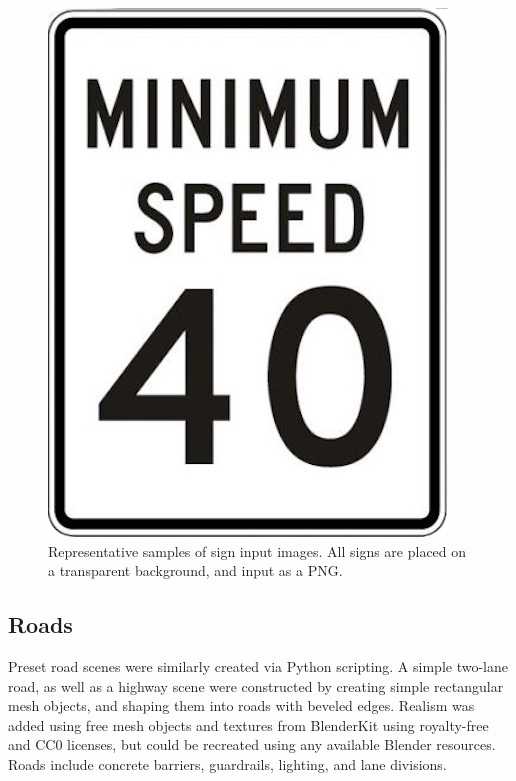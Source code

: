 \documentclass[journal]{IEEEtran}
\begin{document}
\begin{figure}[ht]
\begin{minipage}{0.1\textwidth}
    \end{minipage}\hfill
    \begin{minipage}{0.1\textwidth}
        \centering
        \includegraphics[width=\linewidth]{images/Minimum Speed 40.png}

    \end{minipage}
    \setcounter{figure}{1}
    \caption{Representative samples of sign input images. All signs are placed on a transparent background, and input as a PNG.}
    \label{fig:row_of_images}
\end{figure}

\subsection{Roads}
Preset road scenes were similarly created via Python scripting.  A simple two-lane road, as well as a highway scene were constructed by creating simple rectangular mesh objects, and shaping them into roads with beveled edges. Realism was added using free mesh objects and textures from BlenderKit\cite{blenderkit_platform} using royalty-free and CC0 licenses, but could be recreated using any available Blender resources. Roads include concrete barriers, guardrails, lighting, and lane divisions. 
\end{document}
